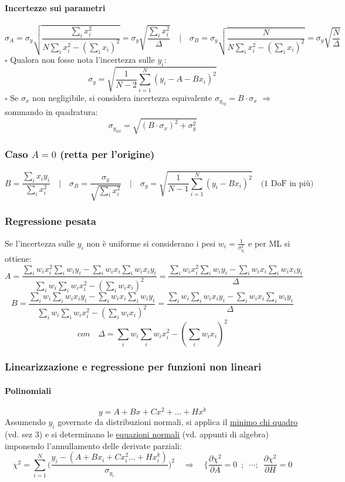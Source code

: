 \documentclass[11pt]{article}
\begin{document}
\paragraph{Incertezze sui parametri}
\[\sigma_A = \sigma_y \sqrt{\frac{\sum_i x_i^2}{N \sum_i x_i^2 - (\sum_i x_i)^2}} = \sigma_y \sqrt{\frac{\sum_i x_i^2}{\Delta}} \quad \Bigg| \quad \sigma_B = \sigma_y \sqrt{\frac{N}{N \sum_i x_i^2 - (\sum_i x_i)^2}} = \sigma_y \sqrt{\frac{N}{\Delta}}\]
$\square$ Qualora non fosse nota l'incertezza sulle $y_i$:
\[\sigma_y = \sqrt{\frac{1}{N-2} \sum \limits_{i = 1}^{N} (y_i - A - B x_i)^2}\]
$\square$ Se $\sigma_x$ non negligibile, si considera incertezza equivalente $\sigma_{y_{eq}} = B \cdot \sigma_x$ $\Longrightarrow$ sommando in quadratura:
\[\sigma_{y_{tot}} = \sqrt{(B \cdot \sigma_x)^2 + \sigma_y^2}\]

\subsubsection*{Caso $A = 0$ (retta per l'origine)}
\[B = \frac{\sum_i x_i y_i}{\sum_i x_i^2} \quad \Bigg| \quad \sigma_B = \frac{\sigma_y}{\sqrt{\sum_i x_i^2}} \quad \Bigg| \quad \sigma_y = \sqrt{\frac{1}{N-1} \sum \limits_{i = 1}^{N} (y_i - B x_i)^2} \quad \textrm{(1 DoF in più)}\]

\subsubsection*{Regressione pesata}
Se l'incertezza sulle $y_i$ non è uniforme si considerano i pesi $w_i = \frac{1}{\sigma_{y_i}^2}$ e per ML si ottiene:
\[A = \frac{\sum_i w_i x_i^2 \sum_i w_i y_i - \sum_i w_i x_i \sum_i w_i x_i y_i}{\sum_i w_i \sum_i w_i x_i^2 - (\sum_i w_i x_i)^2} = \frac{\sum_i w_i x_i^2 \sum_i w_i y_i - \sum_i w_i x_i \sum_i w_i x_i y_i}{\Delta}\] 
\[B = \frac{\sum_i w_i \sum_i w_i x_i y_i - \sum_i w_i x_i \sum_i w_i y_i}{\sum_i w_i \sum_i w_i x_i^2 - (\sum_i w_i x_i)^2} = \frac{\sum_i w_i \sum_i w_i x_i y_i - \sum_i w_i x_i \sum_i w_i y_i}{\Delta}\]
\[con \quad \Delta = \sum_i w_i \sum_i w_i x_i^2 - (\sum_i w_i x_i)^2\]

\subsubsection*{Linearizzazione e regressione per funzioni non lineari}
\paragraph{Polinomiali}
\[y = A + B x + C x^2 + ... + H x^k\]
Assumendo $y_i$ governate da distribuzioni normali, si applica il \underline{minimo chi quadro} (vd. sez 3) e si determinano le \underline{equazioni normali} (vd. appunti di algebra) imponendo l'annullamento delle derivate parziali:
\[\chi^2 = \sum \limits_{i = 1}^N \Bigg( \frac{y_i - (A + B x_i + C x_i^2... + H x_i^k)}{\sigma_{y_i}}\Bigg)^2 \quad \Rightarrow \quad \Bigg\{ \frac{\partial \chi^2}{\partial A} = 0 \enspace ; \enspace \cdots ; \enspace  \frac{\partial \chi^2}{\partial H} = 0 \]
\end{document}
